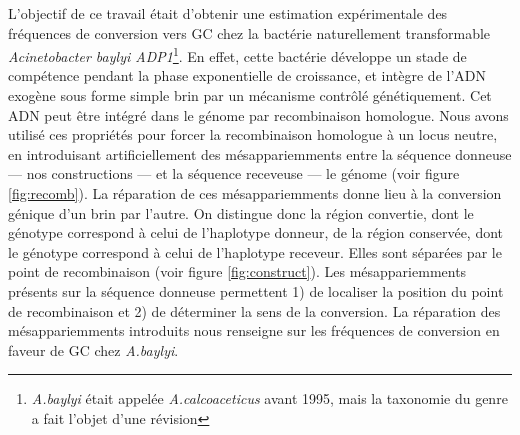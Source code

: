 L'objectif de ce travail était d'obtenir une estimation expérimentale des
fréquences de conversion vers GC chez la bactérie naturellement transformable
\emph{Acinetobacter baylyi ADP1}\footnote{\emph{A.baylyi} était appelée
  \emph{A.calcoaceticus} avant 1995, mais la taxonomie du genre a fait l'objet
  d'une révision\cite{euzeby_list_1997}}. En effet, cette bactérie développe un
stade de compétence pendant la phase exponentielle de croissance, et intègre de
l'ADN exogène sous forme simple brin\cite{chen_dna_2004} par un mécanisme
contrôlé génétiquement. Cet ADN peut être intégré dans le génome par
recombinaison homologue. Nous avons utilisé ces propriétés pour forcer la
recombinaison homologue à un locus neutre, en introduisant artificiellement des
mésappariemments entre la séquence donneuse --- nos constructions --- et la
séquence receveuse --- le génome (voir figure \ref{fig:recomb}). La réparation
de ces mésappariemments donne lieu à la conversion génique d'un brin par
l'autre. On distingue donc la région convertie, dont le génotype correspond à
celui de l'haplotype donneur, de la région conservée, dont le génotype
correspond à celui de l'haplotype receveur. Elles sont séparées par le point de
recombinaison (voir figure \ref{fig:construct}). Les mésappariemments présents
sur la séquence donneuse permettent 1) de localiser la position du point de
recombinaison et 2) de déterminer la sens de la conversion. La réparation des
mésappariemments introduits nous renseigne sur les fréquences de conversion en
faveur de GC chez \emph{A.baylyi}.


\newpage
